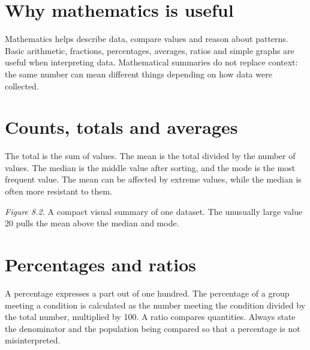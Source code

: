 \documentclass[11pt,openany,oneside]{book}
\begin{document}
\section{Why mathematics is useful}
Mathematics helps describe data, compare values and reason about patterns. Basic arithmetic, fractions, percentages, averages, ratios and simple graphs are useful when interpreting data. Mathematical summaries do not replace context: the same number can mean different things depending on how data were collected.

\section{Counts, totals and averages}
The total is the sum of values. The mean is the total divided by the number of values. The median is the middle value after sorting, and the mode is the most frequent value. The mean can be affected by extreme values, while the median is often more resistant to them.

\begin{center}
\end{center}
\textit{Figure 8.2.} A compact visual summary of one dataset. The unusually large value 20 pulls the mean above the median and mode.

\section{Percentages and ratios}
A percentage expresses a part out of one hundred. The percentage of a group meeting a condition is calculated as the number meeting the condition divided by the total number, multiplied by 100. A ratio compares quantities. Always state the denominator and the population being compared so that a percentage is not misinterpreted.
\end{document}

